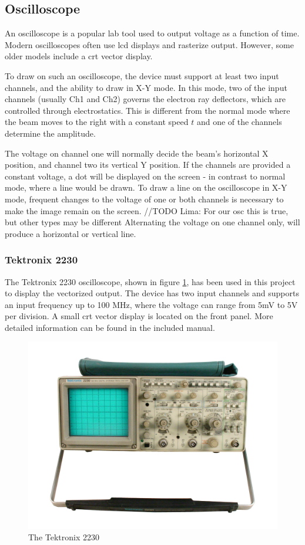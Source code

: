 \subsection{Oscilloscope}
An oscilloscope is a popular lab tool used to output voltage as a function of time.
Modern oscilloscopes often use \gls{lcd} displays and rasterize output. 
However, some older models include a \gls{crt} vector display.

To draw on such an oscilloscope, the device must support at least two input channels, and the ability to draw in X-Y mode.
In this mode, two of the input channels (usually Ch1 and Ch2) governs the electron ray deflectors, which are controlled through electrostatics. 
This is different from the normal mode where the beam moves to the right with a constant speed \( t \) and one of the channels determine the amplitude.

The voltage on channel one will normally decide the beam's horizontal X position, and channel two its vertical Y position.
If the channels are provided a constant voltage, a dot will be displayed on the screen - in contrast to normal mode, where a line would be drawn.
To draw a line on the oscilloscope in X-Y mode, frequent changes to the voltage of one or both channels is necessary to make the image remain on the screen. //TODO Lima: For our osc this is true, but other types may be different
Alternating the voltage on one channel only, will produce a horizontal or vertical line.

\subsubsection{Tektronix 2230}
The Tektronix 2230 oscilloscope, shown in figure \ref{fig:oscilloscope}, has been used in this project to display the vectorized output.
The device has two input channels and supports an input frequency up to 100 MHz, where the voltage can range from 5mV to 5V per division.
A small \gls{crt} vector display is located on the front panel.
More detailed information can be found in the included manual\cite{tektronix2230}.

\begin{figure}[h!]
	\centering
	\includegraphics[width=0.6\linewidth]{images/oscilloscope.jpg}
    \caption{The Tektronix 2230}
    \label{fig:oscilloscope}
\end{figure}


